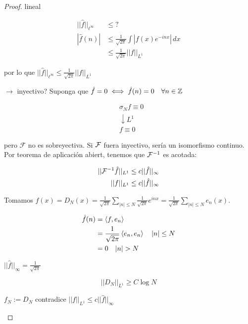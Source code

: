 \begin{proof}
    lineal \checkmark

    \begin{align*}
        ||\hat f||_{\ell^\infty}&\leq ?\\
        |\hat f(n)|&\leq \frac{1}{\sqrt{2\pi}}\int |f(x)e^{-inx}|\,dx\\
        &\leq \frac{1}{\sqrt{2\pi}}||f||_{L^1}
    \end{align*}

    por lo que $||\hat f||_{\ell^\infty}\leq \frac{1}{\sqrt{2\pi}} ||f||_{L^1}$

    $\rightarrow$ inyectivo? Suponga que $\hat f=0\iff \hat f(n)=0\quad\forall n\in\mathbb{Z}$

    \begin{align*}
        &\sigma_N f\equiv 0\\
        &\downarrow L^1\\
        &f\equiv 0
    \end{align*}

    pero $\mathcal{F}$ no es sobreyectiva. Si $\mathcal{F}$ fuera inyectivo, sería un isomorfismo continuo. Por teorema de aplicación abiert, tenemos que $\mathcal{F}^{-1}$ es acotada:

    \begin{align*}
        ||\mathcal{F}^{-1}\hat f||_{L^1}\leq c||\hat f||_{\infty}\\
        ||f||_{L^1}\leq c||\hat f||_{\infty}
    \end{align*}

    Tomamos $f(x)=D_N(x)=\frac{1}{\sqrt{2\pi}}\sum_{|n|\leq N}\frac{1}{\sqrt{2\pi}}e^{inx}=\frac{1}{\sqrt{2\pi}}\sum_{|n|\leq N}e_n(x)$.

    \begin{align*}
        \hat f(n)&=\inn{f,e_n}\\
        &=\frac{1}{\sqrt{2\pi}} \inn{e_n,e_n}\quad |n|\leq N\\
        &=0\quad |n|>N
    \end{align*}

    $||\hat f||_\infty=\frac{1}{\sqrt{2\pi}}$

    \begin{fproposition}
        \[||D_N||_{L^1}\geq C\log N\]
    \end{fproposition}

    \begin{fcorollary}
        $f_N:=D_N$ contradice $||f||_{L^1}\leq c||\hat f||_\infty$
    \end{fcorollary}


\end{proof}
